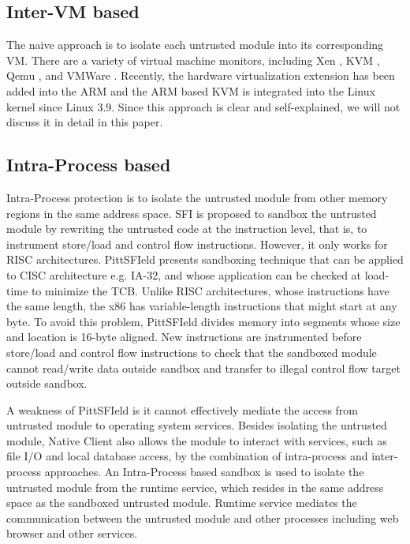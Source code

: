 \subsection{Inter-VM based}
\label{sec:problem2:inter-vm}

The naive approach is to isolate each untrusted module into its corresponding
VM. There are a variety of virtual machine monitors, including Xen \cite{xen},
KVM \cite{kvm}, Qemu \cite{qemu}, and VMWare \cite{vmware}.  Recently, the
hardware virtualization extension has been added into the ARM and the ARM based
KVM \cite{KVM/ARM} is integrated into the Linux kernel since Linux 3.9. Since
this approach is clear and self-explained, we will not discuss it in detail in
this paper.

\subsection{Intra-Process based}
\label{sec:problem2:intra-process}

Intra-Process protection is to isolate the untrusted module from other
memory regions in the same address space. SFI \cite{SFI} is proposed to sandbox
the untrusted module by rewriting the untrusted code at the instruction level,
that is, to instrument store/load and control flow instructions. However, it
only works for RISC architectures. PittSFIeld \cite{PittSFIeld} presents
sandboxing technique that can be applied to CISC architecture e.g. IA-32, and
whose application can be checked at load-time to minimize the TCB.  Unlike RISC
architectures, whose instructions have the same length, the x86 has
variable-length instructions that might start at any byte. To avoid this
problem, PittSFIeld divides memory into segments whose size and location is
16-byte aligned.  New instructions are instrumented before store/load and
control flow instructions to check that the sandboxed module cannot read/write
data outside sandbox and transfer to illegal control flow target outside
sandbox.

A weakness of PittSFIeld is it cannot effectively mediate the access from
untrusted module to operating system services. Besides isolating the untrusted
module, Native Client \cite{NaCl} also allows the module to interact with
services, such as file I/O and local database access, by the combination of
intra-process and inter-process approaches.  An Intra-Process based sandbox is
used to isolate the untrusted module from the runtime service, which resides in
the same address space as the sandboxed untrusted module. Runtime service
mediates the communication between the untrusted module and other processes
including web browser and other services. 

